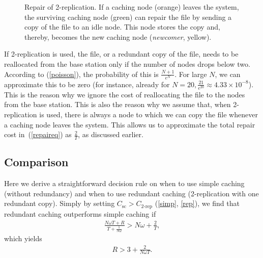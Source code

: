 \documentclass[10pt,conference]{IEEEtran}
\begin{document}
\begin{figure}[htb]
\centering
{}
\caption{Repair of 2-replication. If a caching node (orange) leaves the system, the surviving caching node (green) can repair the file by sending a copy of the file to an idle node. This node stores the copy and, thereby, becomes the new caching node (\emph{newcomer}, yellow).}
\label{failure}
\end{figure}

If 2-replication is used, the file, or a redundant copy of the file,
needs to be reallocated from the base station only if the number of
nodes drops below two. According to (\ref{poisson}), the probability
of this is $\frac{N+1}{e^N}$. For large $N$, we can approximate this
to be zero (for instance, already for $N=20, \frac{21}{e^{20}} \approx
4.33\times 10^{-8}$). This is the reason why we ignore the cost of
reallocating the file to the nodes from the base station. This is also
the reason why we assume that, when 2-replication is used, there is
always a node to which we can copy the file whenever a caching node
leaves the system. This allows us to approximate the total repair cost
in~(\ref{repaireq}) as $\frac{2}{T}$, as discussed earlier.

\subsection{Comparison}
Here we derive a straightforward decision rule on when to use simple
caching (without redundancy) and when to use redundant caching
(2-replication with one redundant copy). Simply by setting
$C_{\text{sc}} > C_{\text{2-rep}}$ (\eqref{simp}, \eqref{rep}), we
find that redundant caching outperforms simple caching if
\begin{align}\nonumber
\frac{N\omega T + R}{T + \frac{1}{N\omega}} > N\omega + \frac{2}{T},
\end{align}
which yields
\begin{align}
R > 3 + \frac{2}{N\omega T}.
\label{R3region}
\end{align}
\end{document}
